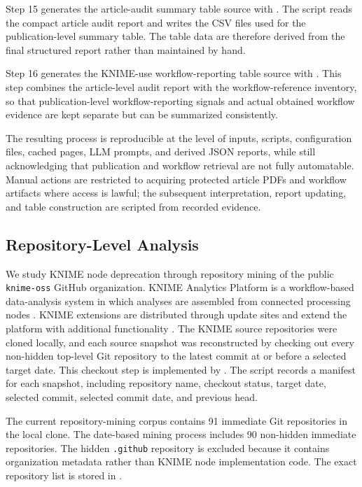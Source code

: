\documentclass[runningheads]{llncs}
\begin{document}
Step 15 generates the article-audit summary table source with
. The script reads the compact
article audit report and writes the CSV files used for the publication-level
summary table. The table data are therefore derived from the final structured
report rather than maintained by hand.

Step 16 generates the KNIME-use workflow-reporting table source with
. This step combines
the article-level audit report with the workflow-reference inventory, so that
publication-level workflow-reporting signals and actual obtained workflow
evidence are kept separate but can be summarized consistently.

The resulting process is reproducible at the level of inputs, scripts,
configuration files, cached pages, LLM prompts, and derived JSON reports, while
still acknowledging that publication and workflow retrieval are not fully
automatable. Manual actions are restricted to acquiring protected article PDFs
and workflow artifacts where access is lawful; the subsequent interpretation,
report updating, and table construction are scripted from recorded evidence.

\subsection{Repository-Level Analysis}

We study KNIME node deprecation through repository mining of the public
\texttt{knime-oss} GitHub organization. KNIME Analytics Platform is a
workflow-based data-analysis system in which analyses are assembled from
connected processing nodes
\cite{Berthold2009KNIME,KNIMEUserGuide2026}. KNIME extensions are distributed
through update sites and extend the platform with additional functionality
\cite{KNIMEExtensions2026}. The KNIME source repositories were cloned locally,
and each source snapshot was reconstructed by checking out every non-hidden
top-level Git repository to the latest commit at or before a selected target
date. This checkout step is implemented by
.
The script records a manifest for each snapshot, including repository name,
checkout status, target date, selected commit, selected commit date, and
previous head.

The current repository-mining corpus contains 91 immediate Git repositories in
the local clone. The date-based mining process includes 90 non-hidden immediate
repositories. The hidden \texttt{.github} repository is excluded because it
contains organization metadata rather than KNIME node implementation code. The
exact repository list is stored in
.
\end{document}
